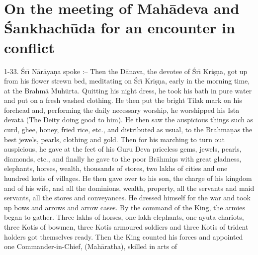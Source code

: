 \chapter{On the meeting of Mah\=adeva and \'Sankhach\=uda for an encounter in conflict}

1-33. \'Sr\={\i} N\=ar\=aya\d{n}a spoke :-- Then the D\=anava, the devotee of \'Sr\={\i} Kri\d{s}\d{n}a, got up from his flower strewn bed, meditating on \'Sr\={\i} Kri\d{s}\d{n}a, early in the morning time, at the Brahm\=a Muh\=urta. Quitting his night dress, he took his bath in pure water and put on a fresh washed clothing. He then put the bright Tilak mark on his forehead and, performing the daily necessary worship, he worshipped his Ista devat\=a (The Deity doing good to him). He then saw the auspicious things such as curd, ghee, honey, fried rice, etc., and distributed as usual, to the Br\=ahma\d{n}as the best jewels, pearls, clothing and gold. Then for his marching to turn out auspicious, he gave at the feet of his Guru Deva priceless gems, jewels, pearls, diamonds, etc., and finally he gave to the poor Br\=ahmi\d{n}s with great gladness, elephants, horses, wealth, thousands of stores, two lakhs of cities and one hundred kotis of villages. He then gave over to his son, the charge of his kingdom and of his wife, and all the dominions, wealth, property, all the servants and maid servants, all the stores and conveyances. He dressed himself for the war and took up bows and arrows and arrow cases. By the command of the King, the armies began to gather. Three lakhs of horses, one lakh elephants, one ayuta chariots, three Kotis of bowmen, three Kotis armoured soldiers and three Kotis of trident holders got themselves ready. Then the King counted his forces and appointed one Commander-in-Chief, (Mah\=aratha), skilled in arts of

